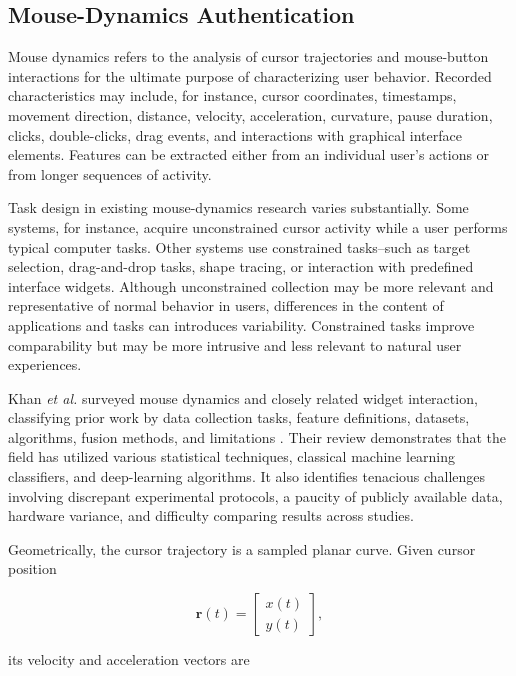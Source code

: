 \documentclass[conference]{IEEEtran}
\begin{document}
\subsection{Mouse-Dynamics Authentication}

Mouse dynamics refers to the analysis of cursor trajectories and mouse-button interactions for the ultimate purpose of characterizing user behavior. Recorded characteristics may include, for instance, cursor coordinates, timestamps, movement direction, distance, velocity, acceleration, curvature, pause duration, clicks, double-clicks, drag events, and interactions with graphical interface elements. Features can be extracted either from an individual user's actions or from longer sequences of activity. 

Task design in existing mouse-dynamics research varies substantially. Some systems, for instance, acquire unconstrained cursor activity while a user performs typical computer tasks. Other systems use constrained tasks--such as target selection, drag-and-drop tasks, shape tracing, or interaction with predefined interface widgets. Although unconstrained collection may be more relevant and representative of normal behavior in users, differences in the content of applications and tasks can introduces variability. Constrained tasks improve comparability but may be more intrusive and less relevant to natural user experiences. 

Khan \textit{et al.} surveyed mouse dynamics and closely related widget interaction, classifying prior work by data collection tasks, feature definitions, datasets, algorithms, fusion methods, and limitations \cite{khanMouseSurvey}. Their review demonstrates that the field has utilized various statistical techniques, classical machine learning classifiers, and deep-learning algorithms. It also identifies tenacious challenges involving discrepant experimental protocols, a paucity of publicly available data, hardware variance, and difficulty comparing results across studies. 

Geometrically, the cursor trajectory is a sampled planar curve. Given cursor position 

\begin{equation}
\mathbf{r}(t)
=
\begin{bmatrix}
x(t)\\
y(t)
\end{bmatrix},
\label{eq:cursor_position}
\end{equation}

its velocity and acceleration vectors are 
\end{document}
